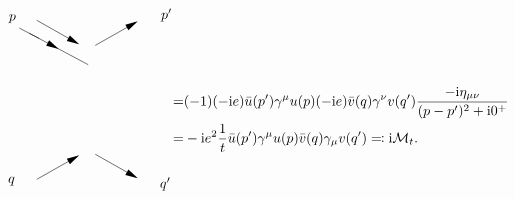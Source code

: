 \begin{equation}
\begin{gathered}
\begin{tikzpicture}[x=0.75pt,y=0.75pt,yscale=-1,xscale=1]
            \draw    (119.94,84.35) -- (176.27,114.35) ;
            \draw [shift={(148.1,99.35)}, rotate = 208.04] [fill={rgb, 255:red, 0; green, 0; blue, 0 }  ][line width=0.08]  [draw opacity=0] (12,-3) -- (0,0) -- (12,3) -- cycle    ;
            \draw    (129.52,89.35) -- (110.35,79.35) ;
            
            \draw    (127.06,223.94) -- (165.99,201.92) ;
            \draw [shift={(167.73,200.94)}, rotate = 150.51] [fill={rgb, 255:red, 0; green, 0; blue, 0 }  ][line width=0.08]  [draw opacity=0] (12,-3) -- (0,0) -- (12,3) -- cycle    ;
            \draw    (221.99,221.95) -- (183.06,199.94) ;
            \draw [shift={(223.73,222.94)}, rotate = 209.49] [fill={rgb, 255:red, 0; green, 0; blue, 0 }  ][line width=0.08]  [draw opacity=0] (12,-3) -- (0,0) -- (12,3) -- cycle    ;
            \draw    (221.99,73.92) -- (183.06,95.94) ;
            \draw [shift={(223.73,72.94)}, rotate = 150.51] [fill={rgb, 255:red, 0; green, 0; blue, 0 }  ][line width=0.08]  [draw opacity=0] (12,-3) -- (0,0) -- (12,3) -- cycle    ;
            \draw    (127.06,71.94) -- (165.99,93.95) ;
            \draw [shift={(167.73,94.94)}, rotate = 209.49] [fill={rgb, 255:red, 0; green, 0; blue, 0 }  ][line width=0.08]  [draw opacity=0] (12,-3) -- (0,0) -- (12,3) -- cycle    ;
            
            \draw (107.35,220.34) node [anchor=north east] [inner sep=0.75pt]    {$q$};
            \draw (243.65,220.75) node [anchor=north west][inner sep=0.75pt]    {$q'$};
            \draw (108.35,75.95) node [anchor=south east] [inner sep=0.75pt]    {$p$};
            \draw (244.65,74.54) node [anchor=south west] [inner sep=0.75pt]    {$p'$};
            \end{tikzpicture}            
    \end{gathered} \begin{aligned}[t]
        =& (-1) (- \ii e) \bar{u}(p') \gamma^\mu u(p) (- \ii e) \bar{v}(q) \gamma^\nu v(q') \frac{- \ii \eta_{\mu \nu}}{(p-p')^2 + \ii 0^+} \\
        =& - \ii e^2 \frac{1}{t} \bar{u}(p') \gamma^\mu u(p) \bar{v}(q) \gamma_\mu v(q') \eqqcolon \ii \mathcal{M}_t.
    \end{aligned}
\end{equation}